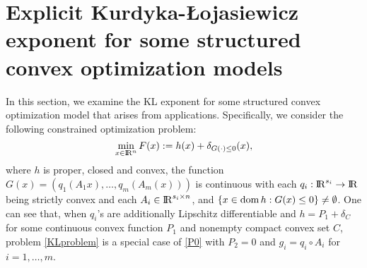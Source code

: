 \documentclass[10pt]{article}
\numberwithin{equation}{section}
\def\R{{\rm I\!R}}
\begin{document}
%

\section{Explicit Kurdyka-{\L}ojasiewicz exponent for some structured convex optimization models}\label{sec5}
In this section, we examine the KL exponent for some structured convex optimization model that arises from applications. Specifically, we consider the following constrained optimization problem:
\begin{equation}\label{KLproblem}
\min\limits_{x\in \R^n}F(x):= h(x) + \delta_{G(\cdot) \leq 0}(x),
\end{equation}
where $h$ is proper, closed and convex, the function $G(x) = (q_1(A_1x), \ldots, q_m(A_m(x)))$ is continuous with each $q_i: \R^{s_i}\to \R$ being strictly convex and each $A_i\in\R^{s_i\times n}$, and $\{x\in {\rm dom}\,h: G(x)\le 0\}\not=\emptyset$. One can see that, when $q_i$'s are additionally Lipschitz differentiable and $h = P_1 + \delta_C$ for some continuous convex function $P_1$ and nonempty compact convex set $C$, problem \eqref{KLproblem} is a special case of \eqref{P0} with $P_2 = 0$ and $g_i = q_i\circ A_i$ for $i = 1, \ldots, m$.
\end{document}
